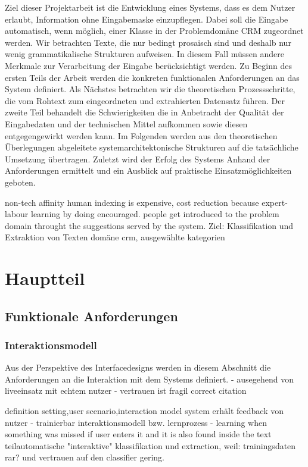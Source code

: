 Ziel dieser Projektarbeit ist die Entwicklung eines Systems, dass es dem Nutzer erlaubt, Information ohne Eingabemaske einzupflegen. Dabei soll die Eingabe automatisch, wenn möglich, einer Klasse in der Problemdomäne CRM zugeordnet werden. Wir betrachten Texte, die nur bedingt prosaisch sind und deshalb nur wenig grammatikalische Strukturen aufweisen. In diesem Fall müssen andere Merkmale zur Verarbeitung der Eingabe berücksichtigt werden.
Zu Beginn des ersten Teils der Arbeit werden die konkreten funktionalen Anforderungen an das System definiert. Als Nächstes betrachten wir die theoretischen Prozessschritte, die vom Rohtext zum eingeordneten und extrahierten Datensatz führen. Der zweite Teil behandelt die Schwierigkeiten die in Anbetracht der Qualität der Eingabedaten und der technischen Mittel aufkommen sowie diesen entgegengewirkt werden kann. Im Folgenden werden aus den theoretischen Überlegungen abgeleitete systemarchitektonische Strukturen auf die tatsächliche Umsetzung übertragen.
Zuletzt wird der Erfolg des Systems Anhand der Anforderungen ermittelt und ein Ausblick auf praktische Einsatzmöglichkeiten geboten.

non-tech affinity \cite{hemken}
human indexing is expensive, cost reduction because expert-labour
learning by doing encouraged. people get introduced to the problem domain throught the suggestions served by the system.
Ziel: Klassifikation und Extraktion von Texten
domäne crm, ausgewählte kategorien
\chapter{Hauptteil}
\section{Funktionale Anforderungen}
\subsection{Interaktionsmodell}
Aus der Perspektive des Interfacedesigns werden in diesem Abschnitt die Anforderungen an die Interaktion mit dem Systems definiert.
- ausegehend von liveeinsatz mit echtem nutzer
- vertrauen ist fragil \cite{hemken} correct citation 

definition setting,user scenario,interaction model
system erhält feedback von nutzer - trainierbar
interaktionsmodell bzw. lernprozess - learning when something was missed if user enters it and it is also found inside the text
teilautomatische "interaktive" klassifikation und extraction, weil: trainingsdaten rar? und vertrauen auf den classifier gering.
